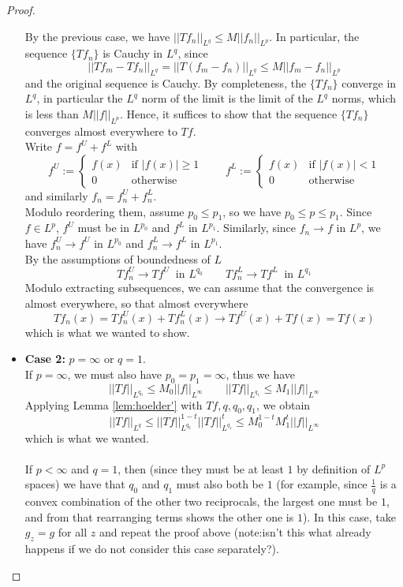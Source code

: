 \begin{proof}
\begin{itemize}
{\begin{itemize}
{        By the previous case, we have $||Tf_n||_{L^q} \leq M ||f_n||_{L^p}$. In particular, the sequence $\{Tf_n\}$ is Cauchy in $L^q$, since
        \[ ||Tf_m - Tf_n||_{L^q} = ||T(f_m-f_n)||_{L^q} \leq M ||f_m - f_n||_{L^p} \]
        and the original sequence is Cauchy. By completeness, the $\{Tf_n\}$ converge in $L^q$, in particular the $L^q$ norm of the limit is the limit of the $L^q$ norms, which is less than $M ||f||_{L^p}$.
        Hence, it suffices to show that the sequence $\{Tf_n\}$ converges almost everywhere to $Tf$.\\
        Write $f= f^U + f^L$ with
        \[ f^U := \begin{cases} f(x) & \text{if } |f(x)|\geq 1 \\ 0 & \text{otherwise} \end{cases} \qquad f^L := \begin{cases} f(x) & \text{if } |f(x)|< 1 \\ 0 & \text{otherwise} \end{cases}  \]
        and similarly $f_n = f_n^U + f_n^L$.\\
        Modulo reordering them, assume $p_0 \leq p_1$, so we have $p_0 \leq p \leq p_1$. Since $f\in L^p$, $f^U$ must be in $L^{p_0}$ and $f^L$ in $L^{p_1}$.
        Similarly, since $f_n \to f$ in $L^p$, we have $f_n^U \to f^U$ in $L^{p_0}$ and $f_n^L \to f^L$ in $L^{p_1}$.\\
        By the assumptions of boundedness of $L$
        \[ Tf_n^U \to Tf^U \ \text{ in } L^{q_0} \qquad Tf_n^L \to Tf^L \ \text{ in } L^{q_1} \]
        Modulo extracting subsequences, we can assume that the convergence is almost everywhere, so that almost everywhere
        \[ Tf_n (x) = Tf_n^U (x) + Tf_n^L(x) \to Tf^U (x) + Tf(x) = Tf (x)\]
        which is what we wanted to show.
        }
    \end{itemize}
    }
    \item{\textbf{Case 2:} $p=\infty$ or $q=1$.\\
    If $p=\infty$, we must also have $p_0=p_1=\infty$, thus we have
    \[ ||Tf||_{L^{q_0}} \leq M_0 ||f||_{L^{\infty}} \qquad ||Tf||_{L^{q_1}} \leq M_1 ||f||_{L^{\infty}} \]
    Applying Lemma \ref{lem:hoelder'} with $Tf, q, q_0, q_1$, we obtain
    \[||Tf||_{L^q} \leq ||Tf||_{L^{q_0}}^{1-t} ||Tf||_{L^{q_1}}^{t} \leq  M_0^{1-t} M_1^t ||f||_{L^{\infty}} \]
    which is what we wanted.\\\\
    If $p<\infty$ and $q=1$, then (since they must be at least $1$ by definition of $L^p$ spaces) we have that $q_0$ and $q_1$ must also both be $1$ (for example, since $\frac{1}{q}$ is a convex combination of the other two reciprocals, the largest one must be $1$, and from that rearranging terms shows the other one is $1$).
    In this case, take $g_z=g$ for all $z$ and repeat the proof above (note:isn't this what already happens if we do not consider this case separately?).
    }
  \end{itemize}
\end{proof}

